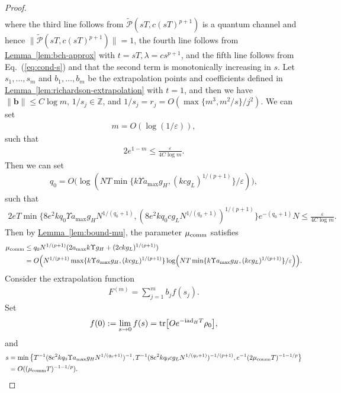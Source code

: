\documentclass[11pt]{article}
\newcommand{\eq}[1]{(\ref{eq:#1})}
\newcommand{\lem}[1]{\hyperref[lem:#1]{Lemma~\ref*{lem:#1}}}
\renewcommand{\i}{\mathrm{i}}
\newcommand{\ad}{\mathrm{ad}}
\newcommand{\eps}{\varepsilon}
\newcommand{\mc}{\mathcal}
\begin{document}
\begin{proof}
\begin{align*}
    \end{align*}
    where the third line follows from $\tilde{\mc P}(sT, c(sT)^{p+1})$ is a quantum channel and hence $\|\tilde{\mc P}(sT,c(sT)^{p+1})\|=1$, the fourth line follows from \lem{bch-approx} with $t=sT,\lambda=cs^{p+1}$, and the fifth line follows from Eq.~\eq{cond-s} and that the second term is monotonically increasing in $s$. Let $s_1, \ldots, s_m$ and $b_1, \ldots, b_m$ be the extrapolation points and coefficients defined in \lem{richardson-extrapolation} with $t=1$, and then we have $\|\mathbf{b}\|\le C\log m$, $1/s_j\in \mathbb{Z}$, and $1/s_j = r_j = O(\max\{m^3, m^2/s\}/j^2)$. We can set \begin{align*}
        m = O(\log(1/\eps)),
    \end{align*}
    such that \begin{align*}
        2e^{1-m} \le \frac{\eps}{4C\log m}.
    \end{align*}
    Then we can set \begin{align*}
        q_0 = O\Big(\log(NT\min\{k\Upsilon a_{\max}g_H, (kcg_L)^{1/(p+1)}\}/\eps)\Big),
    \end{align*}
    such that \begin{align*}
        2eT\min\{8e^2kq_0\Upsilon  a_{\max} g_H N^{1/(q_0+1)}, (8e^2kq_0c g_LN^{1/(q_0+1)})^{1/(p+1)}\}e^{-(q_0+1)}N\le \frac{\eps}{4C\log m}.
    \end{align*}
    Then by \lem{bound-mu}, the parameter $\mu_{\rm comm}$ satisfies \begin{align*}
        \mu_{\rm comm} & \le q_0 N^{1/(p+1)}(2a_{\max}k \Upsilon g_H+ (2ckg_L)^{1/(p+1)}) \\
        & = O\Big( N^{1/(p+1)}\max\{k\Upsilon a_{\max}g_H, (kcg_L)^{1/(p+1)}\}\log(NT\min\{k\Upsilon a_{\max}g_H, (kcg_L)^{1/(p+1)}\}/\eps)\Big).
    \end{align*}
    Consider the extrapolation function \begin{align*}
        F^{(m)} = \sum_{j=1}^m b_j f(s_j). 
    \end{align*}
    Set \begin{align*}
        f(0) :=\lim_{s\to 0} f(s) = \tr[Oe^{-\i \ad_H T}\rho_0],
    \end{align*} and \begin{align*}
        s &= \min\big\{T^{-1}(8e^2kq_0\Upsilon a_{\max} g_HN^{1/(q_0+1)})^{-1}, T^{-1}(8e^2kq_0 c g_LN^{1/(q_0+1)})^{-1/(p+1)}, e^{-1}(2\mu_{\rm comm}T)^{-1-1/p}\big\} \\
        &= O((\mu_{\rm comm}T)^{-1-1/p}).

\end{align*}
\end{proof}
\end{document}
